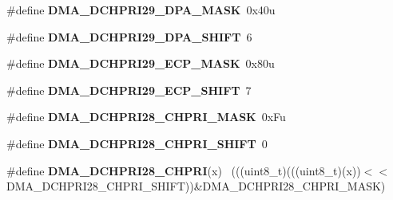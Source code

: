 \begin{DoxyCompactItemize}
\item 
\hypertarget{group___d_m_a___register___masks_ga209c649011508a88213a60d6629d8e33}{}\#define {\bfseries D\+M\+A\+\_\+\+D\+C\+H\+P\+R\+I29\+\_\+\+D\+P\+A\+\_\+\+M\+A\+S\+K}~0x40u\label{group___d_m_a___register___masks_ga209c649011508a88213a60d6629d8e33}

\item 
\hypertarget{group___d_m_a___register___masks_gadcc1a7e6607627202fddf3119f54a47b}{}\#define {\bfseries D\+M\+A\+\_\+\+D\+C\+H\+P\+R\+I29\+\_\+\+D\+P\+A\+\_\+\+S\+H\+I\+F\+T}~6\label{group___d_m_a___register___masks_gadcc1a7e6607627202fddf3119f54a47b}

\item 
\hypertarget{group___d_m_a___register___masks_gabb66621ace7dbafd0af7bdb810d96698}{}\#define {\bfseries D\+M\+A\+\_\+\+D\+C\+H\+P\+R\+I29\+\_\+\+E\+C\+P\+\_\+\+M\+A\+S\+K}~0x80u\label{group___d_m_a___register___masks_gabb66621ace7dbafd0af7bdb810d96698}

\item 
\hypertarget{group___d_m_a___register___masks_ga823e9d42f059b1fb8f583159f3689a88}{}\#define {\bfseries D\+M\+A\+\_\+\+D\+C\+H\+P\+R\+I29\+\_\+\+E\+C\+P\+\_\+\+S\+H\+I\+F\+T}~7\label{group___d_m_a___register___masks_ga823e9d42f059b1fb8f583159f3689a88}

\item 
\hypertarget{group___d_m_a___register___masks_gae1ab5f55d817b43b3fec245d69b2b877}{}\#define {\bfseries D\+M\+A\+\_\+\+D\+C\+H\+P\+R\+I28\+\_\+\+C\+H\+P\+R\+I\+\_\+\+M\+A\+S\+K}~0x\+Fu\label{group___d_m_a___register___masks_gae1ab5f55d817b43b3fec245d69b2b877}

\item 
\hypertarget{group___d_m_a___register___masks_ga8c29973c42741e285c3e2b941eb7d7ff}{}\#define {\bfseries D\+M\+A\+\_\+\+D\+C\+H\+P\+R\+I28\+\_\+\+C\+H\+P\+R\+I\+\_\+\+S\+H\+I\+F\+T}~0\label{group___d_m_a___register___masks_ga8c29973c42741e285c3e2b941eb7d7ff}

\item 
\hypertarget{group___d_m_a___register___masks_gaab8a5a0fd5af995653a43e34616036b7}{}\#define {\bfseries D\+M\+A\+\_\+\+D\+C\+H\+P\+R\+I28\+\_\+\+C\+H\+P\+R\+I}(x)                                    ~(((uint8\+\_\+t)(((uint8\+\_\+t)(x))$<$$<$D\+M\+A\+\_\+\+D\+C\+H\+P\+R\+I28\+\_\+\+C\+H\+P\+R\+I\+\_\+\+S\+H\+I\+F\+T))\&D\+M\+A\+\_\+\+D\+C\+H\+P\+R\+I28\+\_\+\+C\+H\+P\+R\+I\+\_\+\+M\+A\+S\+K)\label{group___d_m_a___register___masks_gaab8a5a0fd5af995653a43e34616036b7}


\end{DoxyCompactItemize}
